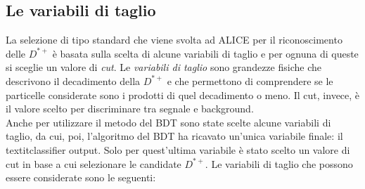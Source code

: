     \subsection{Le variabili di taglio}
    La selezione di tipo standard che viene svolta ad ALICE per il riconoscimento delle $D^{*+}$ è basata sulla scelta di alcune variabili di taglio e per ognuna di queste si sceglie un valore di \textit{cut}. Le \textit{variabili di taglio} sono grandezze fisiche che descrivono il decadimento della $D^{*+}$ e che permettono di comprendere se le particelle considerate sono i prodotti di quel decadimento o meno. Il cut, invece, è il valore scelto per discriminare tra segnale e background. 
    \\Anche per utilizzare il metodo del BDT sono state scelte alcune variabili di taglio, da cui, poi, l'algoritmo del BDT ha ricavato un'unica variabile finale: il textit{classifier output}. Solo per quest'ultima variabile è stato scelto un valore di cut in base a cui selezionare le candidate $D^{*+}$. 
    Le variabili di taglio che possono essere considerate sono le seguenti:
